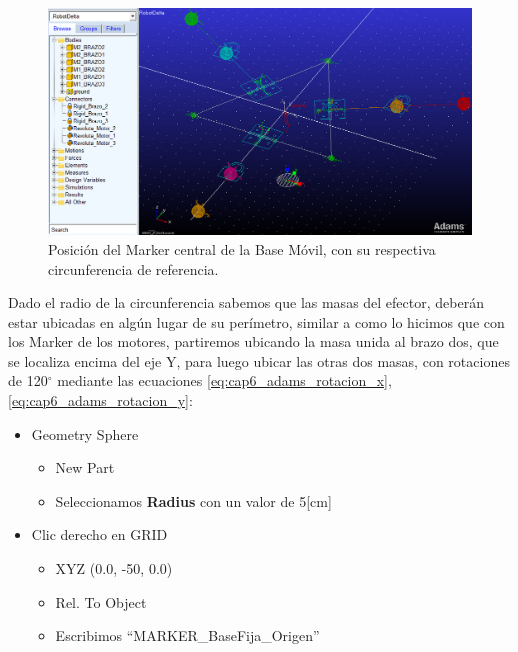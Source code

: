           \begin{figure}[h]
            \centering
            \includegraphics[width=1\linewidth]{Main/Chapter6/Images6/adams/base-movil/posicion_marker_efector.png}
            \caption{Posición del Marker central de la Base Móvil, con su respectiva circunferencia de referencia.}
            \label{f:Cap6_adams_baseMovil_posicion_marker_central}
        \end{figure}
        
        Dado el radio de la circunferencia sabemos que las masas del efector, deberán estar ubicadas en algún lugar de su perímetro, similar a como lo hicimos que con los Marker de los motores, partiremos ubicando la masa unida al brazo dos, que se localiza encima del eje Y, para luego ubicar las otras dos masas, con rotaciones de 120$^{\circ}$ mediante las ecuaciones \eqref{eq:cap6_adams_rotacion_x}, \eqref{eq:cap6_adams_rotacion_y}:
        
        \begin{scope}
            \renewcommand{\labelitemi}{\blacklozenge}
            \renewcommand{\labelitemii}{\checkmark}
            \begin{itemize}
                \item Geometry Sphere
                \begin{itemize}
                    \item New Part
                    \item Seleccionamos \textbf{Radius} con un valor de 5[cm]
                \end{itemize}
                \item Clic derecho en GRID
                \begin{itemize}
                    \item XYZ (0.0, -50, 0.0)
                    \item Rel. To Object
                    \item Escribimos ``MARKER\_BaseFija\_Origen''
                \end{itemize}
            \end{itemize}
        \end{scope}
        
